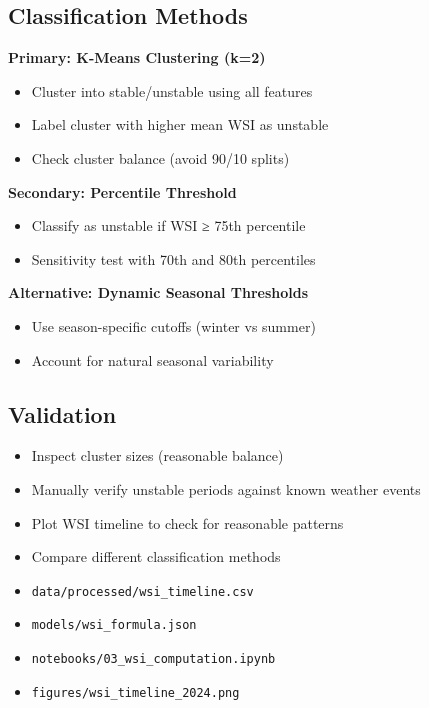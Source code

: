 \documentclass[11pt,a4paper]{article}
\begin{document}
\subsection{Classification Methods}

\textbf{Primary: K-Means Clustering (k=2)}
\begin{itemize}
    \item Cluster into stable/unstable using all features
    \item Label cluster with higher mean WSI as unstable
    \item Check cluster balance (avoid 90/10 splits)
\end{itemize}

\textbf{Secondary: Percentile Threshold}
\begin{itemize}
    \item Classify as unstable if WSI ≥ 75th percentile
    \item Sensitivity test with 70th and 80th percentiles
\end{itemize}

\textbf{Alternative: Dynamic Seasonal Thresholds}
\begin{itemize}
    \item Use season-specific cutoffs (winter vs summer)
    \item Account for natural seasonal variability
\end{itemize}

\subsection{Validation}

\begin{checkbox}
\begin{itemize}
    \item Inspect cluster sizes (reasonable balance)
    \item Manually verify unstable periods against known weather events
    \item Plot WSI timeline to check for reasonable patterns
    \item Compare different classification methods
\end{itemize}
\end{checkbox}

\begin{deliverablebox}
\begin{itemize}
    \item \texttt{data/processed/wsi\_timeline.csv}
    \item \texttt{models/wsi\_formula.json}
    \item \texttt{notebooks/03\_wsi\_computation.ipynb}
    \item \texttt{figures/wsi\_timeline\_2024.png}
\end{itemize}
\end{deliverablebox}
\end{document}
